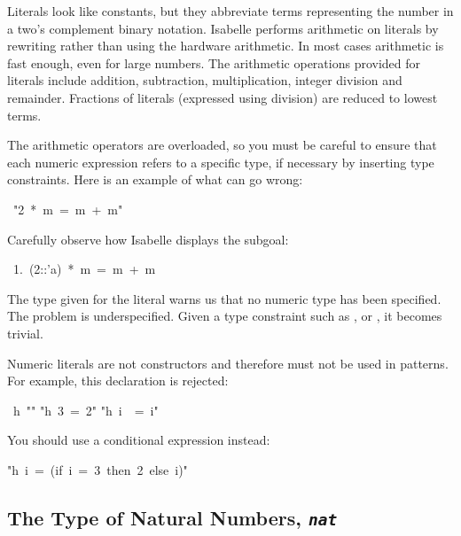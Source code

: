 Literals look like constants, but they abbreviate 
terms representing the number in a two's complement binary notation. 
Isabelle performs arithmetic on literals by rewriting rather 
than using the hardware arithmetic. In most cases arithmetic 
is fast enough, even for large numbers. The arithmetic operations 
provided for literals include addition, subtraction, multiplication, 
integer division and remainder.  Fractions of literals (expressed using
division) are reduced to lowest terms.

\begin{warn}
The arithmetic operators are 
overloaded, so you must be careful to ensure that each numeric 
expression refers to a specific type, if necessary by inserting 
type constraints.  Here is an example of what can go wrong:
\par
\begin{isabelle}
\ "2\ *\ m\ =\ m\ +\ m"
\end{isabelle}
%
Carefully observe how Isabelle displays the subgoal:
\begin{isabelle}
\ 1.\ (2::'a)\ *\ m\ =\ m\ +\ m
\end{isabelle}
The type  given for the literal  warns us that no numeric
type has been specified.  The problem is underspecified.  Given a type
constraint such as ,  or , it becomes trivial.
\end{warn}

\begin{warn}
Numeric literals are not constructors and therefore
must not be used in patterns.  For example, this declaration is
rejected:
\begin{isabelle}
\ h\ "\isacharbraceleft \isacharbraceright "\isanewline
"h\ 3\ =\ 2"\isanewline
"h\ i\ \ =\ i"
\end{isabelle}

You should use a conditional expression instead:
\begin{isabelle}
"h\ i\ =\ (if\ i\ =\ 3\ then\ 2\ else\ i)"
\end{isabelle}
\end{warn}



\subsection{The Type of Natural Numbers, {\tt\slshape nat}}

